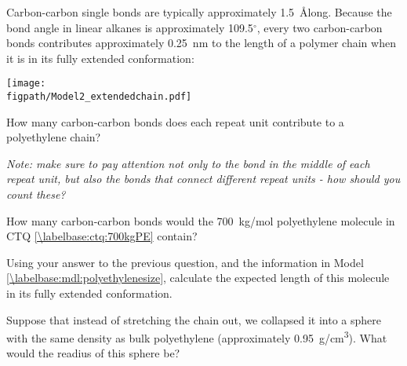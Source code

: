 \begin{activity}
\begin{ctqs}
		\begin{solution}[1.75in]
		\end{solution}
	
\end{ctqs}



\begin{model}
	\label{\labelbase:mdl:polyethylenesize}
	
	Carbon-carbon single bonds are typically approximately 1.5~\AA long.  Because the bond angle in linear alkanes is approximately 109.5${}^\circ$, every two carbon-carbon bonds contributes approximately 0.25~nm to the length of a polymer chain when it is in its fully extended conformation:
	
	\vspace{6pt}
	\centerline{\texttt{[image: \\figpath/Model2\_extendedchain.pdf]}}

\end{model}

\begin{ctqs}

	\question How many carbon-carbon bonds does each repeat unit contribute to a polyethylene chain?
	
		\emph{Note: make sure to pay attention not only to the bond in the middle of each repeat unit, but also the bonds that connect different repeat units - how should you count these?}
		
		\begin{solution}[1in]
		\end{solution}
	
	\question How many carbon-carbon bonds would the 700~kg/mol polyethylene molecule in CTQ \ref{\labelbase:ctq:700kgPE} contain?
		
		\begin{solution}[1in]
		\end{solution}
	
	\question Using your answer to the previous question, and the information in Model \ref{\labelbase:mdl:polyethylenesize}, calculate the expected length of this molecule in its fully extended conformation. \label{\labelbase:ctq:extendedPE}
		
		\begin{solution}[2in]
		\end{solution}
	
	\question Suppose that instead of stretching the chain out, we collapsed it into a sphere with the same density as bulk polyethylene (approximately 0.95~g/cm\textsuperscript{3}).  What would the readius of this sphere be? \label{\labelbase:ctq:collapsedPE}
	

\end{ctqs}
\end{activity}
